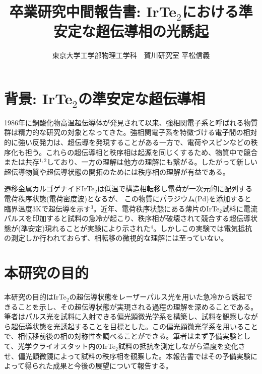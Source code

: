 \documentclass[11pt,a4paper]{jsarticle}
\title{\vspace{-1.5zh}卒業研究中間報告書: IrTe$_2$における準安定な超伝導相の光誘起}
\author{\vspace{-2zh}東京大学工学部物理工学科　賀川研究室 平松信義}
\date{}
\begin{document}
\maketitle
\thispagestyle{mypagestyle}

\vspace{-2zh}
\section{背景: IrTe$_2$の準安定な超伝導相}
1986年に銅酸化物高温超伝導体が発見されて以来、強相関電子系と呼ばれる物質群は精力的な研究の対象となってきた。強相関電子系を特徴づける電子間の相対的に強い反発力は、超伝導を発現することがある一方で、電荷やスピンなどの秩序化も担う。これらの超伝導相と秩序相は起源を同じくするため、物質中で競合または共存$^{1,2}$しており、一方の理解は他方の理解にも繋がる。したがって新しい超伝導物質や超伝導状態の開拓のためには秩序相の理解が有益である。

遷移金属カルゴゲナイドIrTe$_2$は低温で構造相転移し電荷が一次元的に配列する電荷秩序状態(電荷密度波)となるが、
この物質にパラジウム(Pd)を添加すると臨界温度3Kで超伝導を示す$^3$。近年、電荷秩序状態にある薄片のIrTe$_2$試料に電流パルスを印加すると試料の急冷が起こり、秩序相が破壊されて競合する超伝導状態が(準安定)現れることが実験により示された$^4$。しかしこの実験では電気抵抗の測定しか行われておらず、相転移の微視的な理解には至っていない。

\section{本研究の目的}
本研究の目的はIrTe$_2$の超伝導状態をレーザーパルス光を用いた急冷から誘起できることを示し、その超伝導状態が実現される過程の理解を深めることである。筆者はパルス光を試料に入射できる偏光顕微光学系を構築し、試料を観察しながら超伝導状態を光誘起することを目標とした。この偏光顕微光学系を用いることで、相転移前後の相の対称性を調べることができる。筆者はまず予備実験として、光学クライオスタット内のIrTe$_2$試料の抵抗を測定しながら温度を変化させ、偏光顕微鏡によって試料の秩序相を観察した。本報告書ではその予備実験によって得られた成果と今後の展望について報告する。
\end{document}
